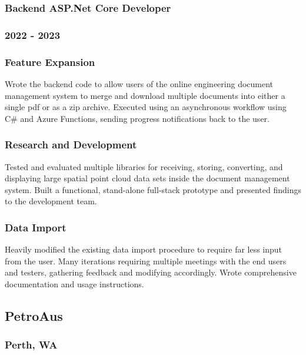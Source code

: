 \documentclass{article}
\begin{document}
\subsubsection{ Backend ASP.Net Core Developer }

\subsubsection{ 2022 - 2023 }

\subsubsection{ Feature Expansion }

Wrote the backend code to allow users of the online engineering document management system to merge and download multiple documents into either a single pdf or as a zip archive. Executed using an asynchronous workflow using C\# and Azure Functions, sending progress notifications back to the user.

\subsubsection{ Research and Development }

Tested and evaluated multiple libraries for receiving, storing, converting, and displaying large spatial point cloud data sets inside the document management system. Built a functional, stand-alone full-stack prototype and presented findings to the development team.

\subsubsection{ Data Import }

Heavily modified the existing data import procedure to require far less input from the user. Many iterations requiring multiple meetings with the end users and testers, gathering feedback and modifying accordingly. Wrote comprehensive documentation and usage instructions.

\subsection{ PetroAus }

\subsubsection{ Perth, WA }
\end{document}
